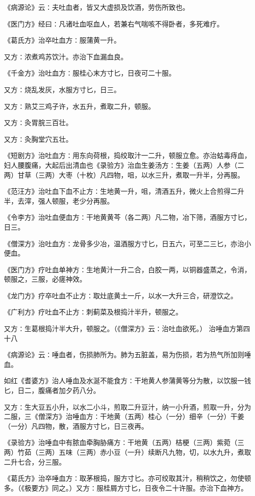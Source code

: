 \documentclass[a4paper,12pt,UTF8,twoside]{ctexbook}
\begin{document}
《病源论》云∶夫吐血者，皆又大虚损及饮酒，劳伤所致也。

《医门方》经曰∶凡诸吐血呕血人，若兼右气喘咳不得卧者，多死难疗。

《葛氏方》治卒吐血方∶服蒲黄一升。

又方∶浓煮鸡苏饮汁。亦治下血漏血良。

《千金方》治吐血方∶服桂心末方寸匕，日夜可二十服。

又方∶烧乱发灰，水服方寸匕，日三。

又方∶熟艾三鸡子许，水五升，煮取二升，顿服。

又方∶灸胃脘三百壮。

又方∶灸胸堂穴五壮。

《短剧方》治吐血方∶用东向荷根，捣绞取汁一二升，顿服立愈。亦治蛄毒痔血，妇人腰腹痛，大起后出清血也《录验方》治血生姜汤方∶生姜（五两）人参（二两）甘草（三两）大枣（十枚）凡四物，咀，以水三升，煮取一升半，分再服。

《范汪方》治吐血下血不止方∶生地黄一升，咀，清酒五升，微火上合煎得二升半，去滓，强人顿服，老少分再服。

《令李方》治吐血便血方∶干地黄黄芩（各二两）凡二物，冶下筛，酒服方寸匕，日三。

《僧深方》治吐血方∶龙骨多少冶，温酒服方寸匕，日五六，可至二三匕，亦治小便血。

《医门方》疗吐血单神方∶生地黄汁一升二合，白胶一两，以铜器盛蒸之，令消，顿服之，三服，必瘥神效。

《龙门方》疗卒吐血不止方∶取灶底黄土一斤，以水一大升三合，研澄饮之。

《广利方》疗吐血不止方∶刺蓟菜及根捣汁半升，顿服之。

又方∶生葛根捣汁半大升，顿服之。（《僧深方》云∶治吐血欲死。）
治唾血方第四十八

《病源论》云∶唾血者，伤损肺所为。肺为五脏盖，易为伤损，若为热气所加则唾血。

如红《耆婆方》治人唾血及水涎不能食方∶干地黄人参蒲黄等分为散，以饮服一钱匕，日二，腹痛者加夕药八分。

又方∶生大豆五小升，以水二小斗，煎取二升豆汁，纳一小升酒，煎取一升，分为二服，三《僧深方》治唾血方∶干地黄（五两）桂心（一分）细辛（一分）干姜（一分）凡四物，散，酒服方寸匕，日三夜再。

《录验方》治唾血中有脓血牵胸胁痛方∶干地黄（五两）桔梗（三两）紫菀（三两）竹茹（三两）五味（三两）赤小豆（一升）续断凡九物，切，以水九升，煮取二升七合，分三服。

《葛氏方》治卒唾血方∶取茅根捣，服方寸匕。亦可绞取其汁，稍稍饮之，勿使顿多。（《极要方》同之。）又方∶服桂屑方寸匕，日夜令二十许服。亦治下血神方。
\end{document}
